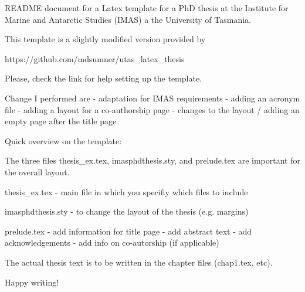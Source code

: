 README document for a Latex template for a PhD thesis at the Institute for Marine and Antarctic Studies (IMAS) a the University of Tasmania.

This template is a slightly modified version provided by 

https://github.com/mdsumner/utas_latex_thesis

Please, check the link for help setting up the template. 

Change I performed are
- adaptation for IMAS requirements
- adding an acronym file
- adding a layout for a co-authorship page
- changes to the layout / adding an empty page after the title page

Quick overview on the template:

The three files thesis_ex.tex, imasphdthesis.sty, and prelude.tex are important for the overall layout.

thesis_ex.tex
- main file in which you specifiy which files to include

imasphdthesis.sty 
- to change the layout of the thesis (e.g. margins)

prelude.tex
- add information for title page
- add abstract text
- add acknowledgements
- add info on co-autorship (if applicable)

The actual thesis text is to be written in the chapter files (chap1.tex, etc). 

Happy writing!
